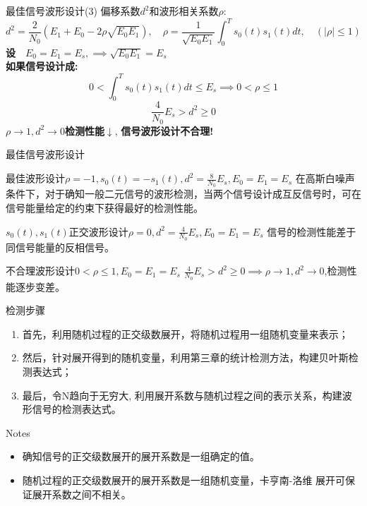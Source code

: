 \begin{frame}{最佳信号波形设计(3)}
偏移系数$d^2$和波形相关系数$\rho$:
\[d^2=\frac{2}{N_0}(E_1+E_0-2\rho\sqrt{E_0E_1}),\quad \rho=\frac{1}{\sqrt{E_{0}E_{1}}}\int_{0}^{T}s_0(t)s_1(t)dt,\quad(|\rho|\le 1) \]
\textbf{设}$\quad E_0=E_1=E_s,\implies\sqrt{E_0E_1}=E_s$\\
\textbf{如果信号设计成:} 
\[0<\int_{0}^{T}s_0(t)s_1(t)dt\le E_s\implies 0<\rho\le 1 \]
\[\frac{4}{N_0}E_s>d^2\ge 0\]
$\rho\to 1, d^2\to 0$\textbf{检测性能}$\downarrow$, \textbf{信号波形设计不合理!}
\end{frame}

\begin{frame}{最佳信号波形设计}
\begin{block}{最佳波形设计$\rho=-1,s_0(t)=-s_1(t),d^2=\frac{8}{N_0}E_s,E_0=E_1=E_s$}
	在高斯白噪声条件下，对于确知一般二元信号的波形检测，当两个信号设计成互反信号时，可在信号能量给定的约束下获得最好的检测性能。
\end{block}
\begin{block}{$s_0(t),s_1(t)$正交波形设计$\rho=0,d^2=\frac{4}{N_0}E_s,E_0=E_1=E_s$}
	信号的检测性能差于同信号能量的反相信号。
\end{block}
\begin{block}{不合理波形设计$0<\rho\le 1,E_0=E_1=E_s$}
	$\frac{4}{N_0}E_s>d^2\ge 0\implies\rho\to 1,d^2\to 0$,检测性能逐步变差。
\end{block}
\end{frame}

\begin{frame}{检测步骤}
\begin{enumerate}
	\setlength{\itemsep}{.5cm}
	\item 首先，利用随机过程的正交级数展开，将随机过程用一组随机变量来表示；
	\item 然后，针对展开得到的随机变量，利用第三章的统计检测方法，构建贝叶斯检测表达式；
	\item 最后，令N趋向于无穷大, 利用展开系数与随机过程之间的表示关系，构建波形信号的检测表达式。
\end{enumerate}
\begin{block}{Notes}
	\begin{itemize}
		\item 确知信号的正交级数展开的展开系数是一组确定的值。
		\item 随机过程的正交级数展开的展开系数是一组随机变量，卡亨南-洛维
		展开可保证展开系数之间不相关。
	\end{itemize}
\end{block}
\end{frame}

